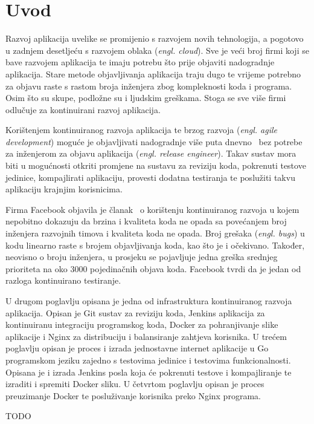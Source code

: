 \chapter{Uvod}
Razvoj aplikacija uvelike se promijenio s razvojem novih tehnologija, a pogotovo u zadnjem desetljeću
s razvojem oblaka (\textit{engl. cloud}). Sve je veći broj firmi koji se bave razvojem aplikacija
te imaju potrebu što prije objaviti nadogradnje aplikacija. Stare metode objavljivanja aplikacija
traju dugo te vrijeme potrebno za objavu raste s rastom broja inženjera zbog kompleknosti koda i
programa. Osim što su skupe, podložne su i ljudskim greškama. Stoga se sve više firmi odlučuje za
kontinuirani razvoj aplikacija.

Korištenjem kontinuiranog razvoja aplikacija te brzog razvoja (\textit{engl. agile development})
moguće je objavljivati nadogradnje više puta dnevno~\citep{abrahamsson2017agile} bez potrebe za
inženjerom za objavu aplikacija (\textit{engl. release engineer}). Takav sustav mora biti u
mogućnosti otkriti promjene na sustavu za reviziju koda, pokrenuti testove jedinice, kompajlirati
aplikaciju, provesti dodatna testiranja te poslužiti takvu aplikaciju krajnjim korisnicima.

Firma Facebook objavila je članak~\citep{rossi2016continuous} o korištenju kontinuiranog razvoja u
kojem nepobitno dokazuju da brzina i kvaliteta koda ne opada sa povećanjem broj inženjera razvojnih
timova i kvaliteta koda ne opada. Broj grešaka (\textit{engl. bugs}) u kodu linearno raste s brojem
objavljivanja koda, kao što je i očekivano. Također, neovisno o broju inženjera, u prosjeku se
pojavljuje jedna greška srednjeg prioriteta na oko 3000 pojedinačnih objava koda.  Facebook tvrdi da
je jedan od razloga kontinuirano testiranje.

U drugom poglavlju opisana je jedna od infrastruktura kontinuiranog razvoja aplikacija. Opisan je
Git sustav za reviziju koda, Jenkins aplikacija za kontinuiranu integraciju programskog koda,
Docker za pohranjivanje slike aplikacije i Nginx za distribuciju i balansiranje zahtjeva korisnika.
U trećem poglavlju opisan je proces i izrada jednostavne internet aplikacije u Go programskom jeziku
zajedno s testovima jedinice i testovima funkcionalnosti. Opisana je i izrada Jenkins posla koja će
pokrenuti testove i kompajliranje te izraditi i spremiti Docker sliku. U četvrtom poglavlju opisan
je proces preuzimanje Docker te posluživanje korisnika preko Nginx programa.

TODO
